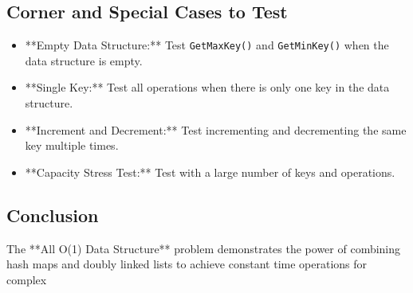 \subsection*{Corner and Special Cases to Test}
\begin{itemize}
    \item **Empty Data Structure:** Test \texttt{GetMaxKey()} and \texttt{GetMinKey()} when the data structure is empty.
    \item **Single Key:** Test all operations when there is only one key in the data structure.
    \item **Increment and Decrement:** Test incrementing and decrementing the same key multiple times.
    \item **Capacity Stress Test:** Test with a large number of keys and operations.
\end{itemize}

\subsection*{Conclusion}
The **All O(1) Data Structure** problem demonstrates the power of combining hash maps and doubly linked lists to achieve constant time operations for complex